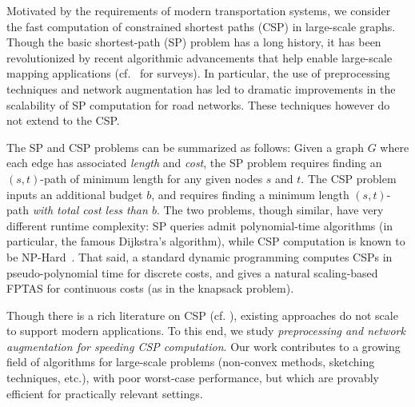 Motivated by the requirements of modern transportation systems, we consider the fast computation of constrained shortest paths (CSP) in large-scale graphs. Though the basic shortest-path (SP) problem has a long history, it has been revolutionized by recent algorithmic advancements that help enable large-scale mapping applications (cf.~\cite{goldberg_survey,dimacs09} for surveys).
In particular, the use of preprocessing techniques and network augmentation has led to dramatic improvements in the scalability of SP computation for road networks.
These techniques however do not extend to the CSP.

The SP and CSP problems can be summarized as follows: Given a graph $G$ where each edge has associated \emph{length} and \emph{cost}, the SP problem requires finding an $(s,t)$-path of minimum length for any given nodes $s$ and $t$. 
The CSP problem inputs an additional budget $b$, and requires finding a minimum length $(s,t)$-path \emph{with total cost less than $b$}.
The two problems, though similar, have very different runtime complexity: SP queries admit polynomial-time algorithms (in particular, the famous Dijkstra's algorithm), while CSP computation is known to be NP-Hard~\cite{csp_survey}.
That said, a standard dynamic programming computes CSPs in pseudo-polynomial time for discrete costs, and gives a natural scaling-based FPTAS for continuous costs (as in the knapsack problem).

Though there is a rich literature on CSP (cf. \cite{csp_survey}), existing approaches do not scale to support modern applications. 
To this end, we study \emph{preprocessing and network augmentation for speeding CSP computation}.
Our work contributes to a growing field of algorithms for large-scale problems (non-convex methods, sketching techniques, etc.), with poor worst-case performance, but which are provably efficient for practically relevant settings.

